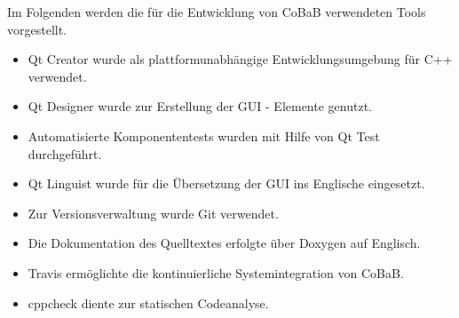 Im Folgenden werden die für die Entwicklung von CoBaB verwendeten Tools vorgestellt.

\begin{itemize}
\item Qt Creator wurde als plattformunabhängige Entwicklungsumgebung für C++ verwendet.
\item Qt Designer wurde zur Erstellung der GUI - Elemente genutzt.
\item Automatisierte Komponententests wurden mit Hilfe von Qt Test durchgeführt.
\item Qt Linguist wurde für die Übersetzung der GUI ins Englische eingesetzt.
\item Zur Versionsverwaltung wurde Git verwendet.
\item Die Dokumentation des Quelltextes erfolgte über Doxygen auf Englisch.
\item Travis ermöglichte die kontinuierliche Systemintegration von CoBaB.
\item cppcheck diente zur statischen Codeanalyse.
\end{itemize}